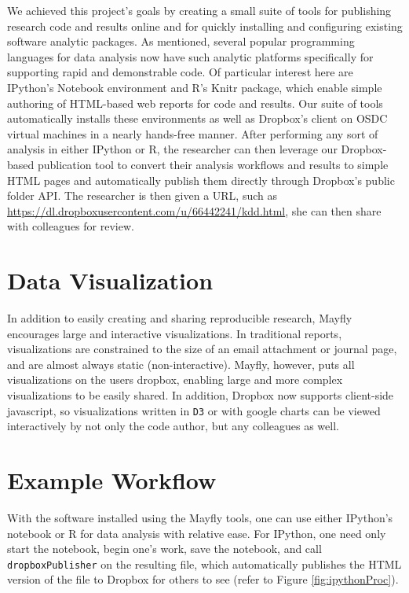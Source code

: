 \documentclass[10pt,a4]{article}
\begin{document}
We achieved this project's goals by creating a small suite of tools for publishing research code and results online and for quickly installing and configuring existing software analytic packages.
As mentioned, several popular programming languages for data analysis now have such analytic platforms specifically for supporting rapid and demonstrable code.
Of particular interest here are IPython's Notebook environment and R's Knitr package, which enable simple authoring of HTML-based web reports for code and results. 
Our suite of tools automatically installs these environments as well as Dropbox's client on OSDC virtual machines in a nearly hands-free manner.
After performing any sort of analysis in either IPython or R, the researcher can then leverage our Dropbox-based publication tool to convert their analysis workflows and results to simple HTML pages and automatically publish them directly through Dropbox's public folder API.
The researcher is then given a URL, such as \url{https://dl.dropboxusercontent.com/u/66442241/kdd.html}, she can then share with colleagues for review.


\section{Data Visualization}
In addition to easily creating and sharing reproducible research, Mayfly encourages large and interactive visualizations. In traditional reports, visualizations are constrained to the size of an email attachment or journal page, and are almost always static (non-interactive). 
Mayfly, however, puts all visualizations on the users dropbox, enabling large and more complex visualizations to be easily shared. In addition, Dropbox now supports client-side javascript, so visualizations written in \texttt{D3} or with google charts can be viewed interactively by not only the code author, but any colleagues as well. 


\section{Example Workflow}

With the software installed using the Mayfly tools, one can use either IPython's notebook or R for data analysis with relative ease.
For IPython, one need only start the notebook, begin one's work, save the notebook, and call \texttt{dropboxPublisher} on the resulting file, which automatically publishes the HTML version of the file to Dropbox for others to see (refer to Figure \ref{fig:ipythonProc}).
\end{document}
